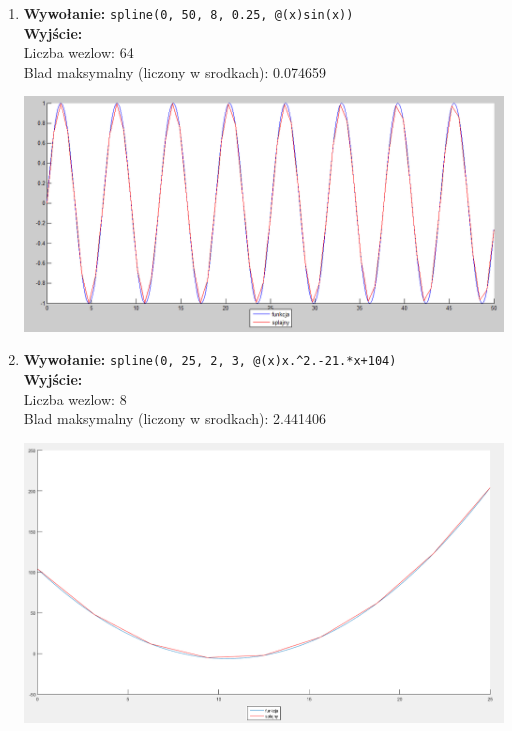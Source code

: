 \documentclass[]{article}
\begin{document}
\begin{enumerate}
\item \textbf{Wywołanie:} \verb|spline(0, 50, 8, 0.25, @(x)sin(x))|
\\\textbf{Wyjście:}
\\Liczba wezlow: 64
\\Blad maksymalny (liczony w srodkach): 0.074659
\begin{center}
	\includegraphics[scale = 0.4]{3.png}
\end{center}
\newpage
\item \textbf{Wywołanie:} \verb|spline(0, 25, 2, 3, @(x)x.^2.-21.*x+104)|
\\\textbf{Wyjście:}
\\Liczba wezlow: 8
\\Blad maksymalny (liczony w srodkach): 2.441406
\begin{center}
	\includegraphics[scale = 0.33]{4.png}
\end{center}
\end{enumerate}
\end{document}
